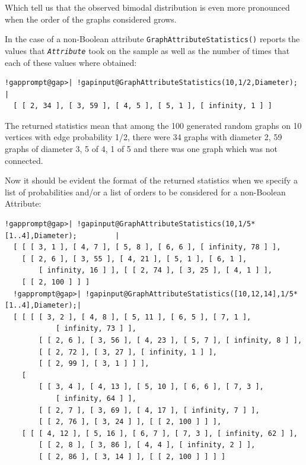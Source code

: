 \documentclass[a4paper,11pt]{report}
\begin{document}
{{{Which tell us that the observed bimodal distribution is even more pronounced
when the order of the graphs considered grows. 

In the case of a non-Boolean attribute \texttt{GraphAttributeStatistics()} reports the values that \mbox{\texttt{\mdseries\slshape Attribute}} took on the sample as well as the number of times that each of these values
where obtained: 

 
\begin{Verbatim}[commandchars=!@|,fontsize=\small,frame=single,label=Example]
  !gapprompt@gap>| !gapinput@GraphAttributeStatistics(10,1/2,Diameter);     |
  [ [ 2, 34 ], [ 3, 59 ], [ 4, 5 ], [ 5, 1 ], [ infinity, 1 ] ]
\end{Verbatim}
 

The returned statistics mean that among the 100 generated random graphs on 10
vertices with edge probability 1/2, there were 34 graphs with diameter 2, 59
graphs of diameter 3, 5 of 4, 1 of 5 and there was one graph which was not
connected. 

Now it should be evident the format of the returned statistics when we specify
a list of probabilities and/or a list of orders to be considered for a
non-Boolean Attribute: 

 
\begin{Verbatim}[commandchars=!@|,fontsize=\small,frame=single,label=Example]
  !gapprompt@gap>| !gapinput@GraphAttributeStatistics(10,1/5*[1..4],Diameter);         |
  [ [ [ 3, 1 ], [ 4, 7 ], [ 5, 8 ], [ 6, 6 ], [ infinity, 78 ] ], 
    [ [ 2, 6 ], [ 3, 55 ], [ 4, 21 ], [ 5, 1 ], [ 6, 1 ], 
        [ infinity, 16 ] ], [ [ 2, 74 ], [ 3, 25 ], [ 4, 1 ] ], 
    [ [ 2, 100 ] ] ]
  !gapprompt@gap>| !gapinput@GraphAttributeStatistics([10,12,14],1/5*[1..4],Diameter);|
  [ [ [ [ 3, 2 ], [ 4, 8 ], [ 5, 11 ], [ 6, 5 ], [ 7, 1 ], 
            [ infinity, 73 ] ], 
        [ [ 2, 6 ], [ 3, 56 ], [ 4, 23 ], [ 5, 7 ], [ infinity, 8 ] ], 
        [ [ 2, 72 ], [ 3, 27 ], [ infinity, 1 ] ], 
        [ [ 2, 99 ], [ 3, 1 ] ] ], 
    [ 
        [ [ 3, 4 ], [ 4, 13 ], [ 5, 10 ], [ 6, 6 ], [ 7, 3 ], 
            [ infinity, 64 ] ], 
        [ [ 2, 7 ], [ 3, 69 ], [ 4, 17 ], [ infinity, 7 ] ], 
        [ [ 2, 76 ], [ 3, 24 ] ], [ [ 2, 100 ] ] ], 
    [ [ [ 4, 12 ], [ 5, 16 ], [ 6, 7 ], [ 7, 3 ], [ infinity, 62 ] ], 
        [ [ 2, 8 ], [ 3, 86 ], [ 4, 4 ], [ infinity, 2 ] ], 
        [ [ 2, 86 ], [ 3, 14 ] ], [ [ 2, 100 ] ] ] ]
\end{Verbatim}
 }

 

}}
\end{document}
